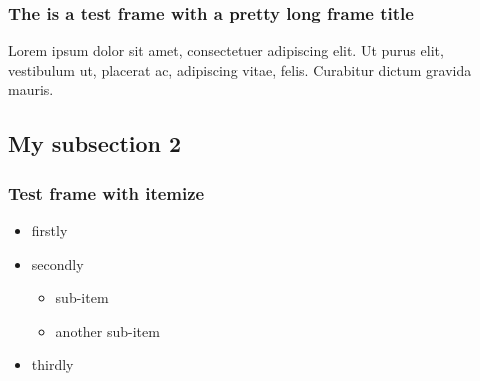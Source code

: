 \documentclass[pdflatex,compress,aspectratio=169]{beamer}
\begin{document}


\begin{frame}

\frametitle{The is a test frame with a pretty long frame title}
Lorem ipsum dolor sit amet, consectetuer adipiscing elit. Ut purus
elit, vestibulum ut, placerat ac, adipiscing vitae, felis. Curabitur
dictum gravida mauris.

\end{frame}

\subsection{My subsection 2}
\begin{frame}
\frametitle{Test frame with itemize}

\begin{itemize}
    \item<1-> firstly
    \item<2-> secondly
        \begin{itemize}
            \item sub-item
            \item another sub-item
        \end{itemize}
      \item<3-> thirdly
\end{itemize}

\end{frame}
\end{document}
